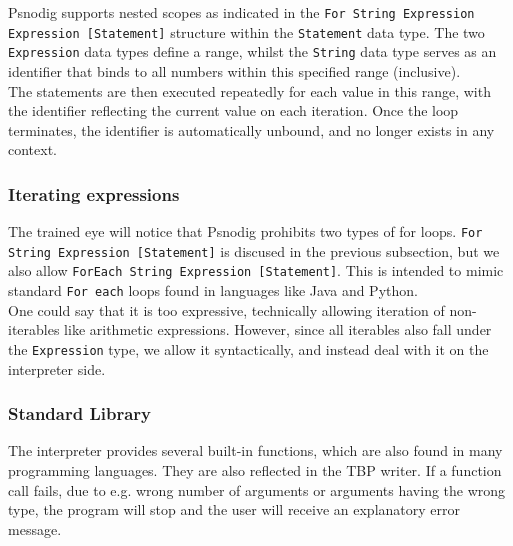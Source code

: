 Psnodig supports nested scopes as indicated in the \texttt{For String Expression Expression [Statement]} structure within the \texttt{Statement} data type. The two \texttt{Expression} data types define a range, whilst the \texttt{String} data type serves as an identifier that binds to all numbers within this specified range (inclusive). \hfill \\

The statements are then executed repeatedly for each value in this range, with the identifier reflecting the current value on each iteration. Once the loop terminates, the identifier is automatically unbound, and no longer exists in any context.

\subsubsection{Iterating expressions}

The trained eye will notice that Psnodig prohibits two types of for loops. \texttt{For String Expression [Statement]} is discused in the previous subsection, but we also allow \texttt{ForEach String Expression [Statement]}. This is intended to mimic standard \texttt{For each} loops found in languages like Java and Python. \hfill \\

One could say that it is too expressive, technically allowing iteration of non-iterables like arithmetic expressions. However, since all iterables also fall under the \texttt{Expression} type, we allow it syntactically, and instead deal with it on the interpreter side.

\subsubsection{Standard Library}

The interpreter provides several built-in functions, which are also found in many programming languages. They are also reflected in the TBP writer. If a function call fails, due to e.g. wrong number of arguments or arguments having the wrong type, the program will stop and the user will receive an explanatory error message. \hfill \\



